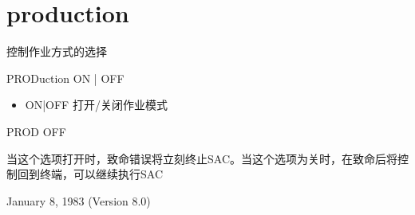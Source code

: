 \section{production}
\label{cmd:production}

控制作业方式的选择

PRODuction ON | OFF

\begin{itemize}
\item ON|OFF 打开/关闭作业模式
\end{itemize}

PROD OFF

当这个选项打开时，致命错误将立刻终止SAC。当这个选项为关时，在致命后将控制回到终端，可以继续执行SAC

January 8, 1983 (Version 8.0)
